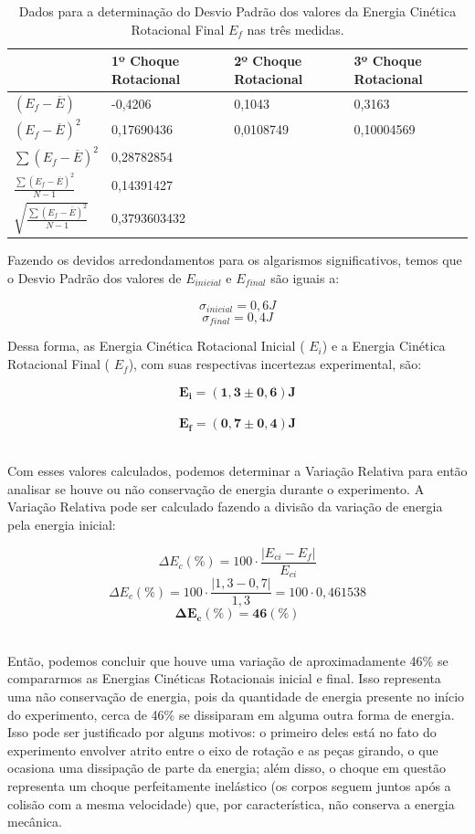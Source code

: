 \begin{table}[H]
    \centering
    \begin{tabular}{ |M{3cm}||M{2.8cm}||M{2.8cm}||M{2.8cm}|}
        \hline
        \textbf{ } & \textbf{1º Choque Rotacional} & \textbf{2º Choque Rotacional} & \textbf{3º Choque Rotacional}\\
        \hline
        $(E_f - \overline{E})$                                        & -0,4206    & 0,1043  & 0,3163\\
        $(E_f - \overline{E})^2$                                      & 0,17690436    & 0,0108749  & 0,10004569\\
        $\sum(E_f - \overline{E})^2$                                  & 0,28782854  &    & \\
        $\frac {\sum(E_f - \overline{E})^2}{N-1}$                     & 0,14391427   &    &\\
        $\sqrt{\frac {\sum(E_f - \overline{E})^2}{N-1}}$              & 0,3793603432   &    &\\
        \hline
    \end{tabular}
    \caption{Dados para a determinação do Desvio Padrão dos valores da Energia Cinética Rotacional Final $E_f$ nas três medidas.}
\end{table}

Fazendo os devidos arredondamentos para os algarismos significativos, temos que o Desvio Padrão  dos valores de $E_{inicial}$ e $E_{final}$ são iguais a:

\[\sigma_{inicial} = 0,6 J\]
\[\sigma_{final} = 0,4 J\]

Dessa forma, as Energia Cinética Rotacional Inicial ( $E_i$) e a Energia Cinética Rotacional Final ( $E_f$), com suas respectivas incertezas experimental, são:

\[\mathbf{E_i = (1,3 \pm 0,6) J}\]\
\[\mathbf{E_f = (0,7 \pm 0,4) J}\]\

Com esses valores calculados, podemos determinar a Variação Relativa para então analisar se houve ou não conservação de energia durante o experimento. A Variação Relativa pode ser calculado fazendo a divisão da variação de energia pela energia inicial:

\[\Delta E_c (\%) = 100 \cdot \frac{|E_{ci} - E_f|}{E_{ci}}\]
\[\Delta E_c (\%) = 100 \cdot \frac{|1,3 - 0,7|}{1,3} = 100 \cdot 0,461538\]
\[\mathbf{\Delta E_c (\%) = 46(\%)}\]\

Então, podemos concluir que houve uma variação de aproximadamente 46\% se compararmos as Energias Cinéticas Rotacionais inicial e final. Isso representa uma não conservação de energia, pois da quantidade de energia presente no início do experimento, cerca de 46\% se dissiparam em alguma outra forma de energia. Isso pode ser justificado por alguns motivos: o primeiro deles está no fato do experimento envolver atrito entre o eixo de rotação e as peças girando, o que ocasiona uma dissipação de parte da energia; além disso, o choque em questão representa um choque perfeitamente inelástico (os corpos seguem juntos após a colisão com a mesma velocidade) que, por característica, não conserva a energia mecânica.

